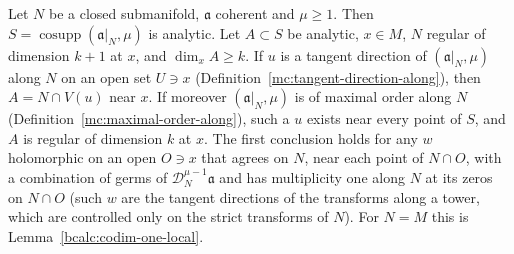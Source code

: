 \begin{lemma}
\label{bcalc:codim-one-local-along}
\leanok
Let \(N\) be a closed submanifold, \(\mathfrak a\) coherent and \(\mu\ge1\). Then \(S=\operatorname{cosupp}(\mathfrak a|_N,\mu)\) is analytic. Let \(A\subset S\) be
analytic, \(x\in M\), \(N\) regular of dimension \(k+1\) at \(x\), and \(\dim_xA\ge k\). If \(u\) is a tangent direction of \((\mathfrak a|_N,\mu)\) along \(N\) on an open
set \(U\ni x\) (Definition~\ref{mc:tangent-direction-along}), then \(A=N\cap V(u)\) near \(x\). If moreover \((\mathfrak a|_N,\mu)\) is of maximal order along \(N\)
(Definition~\ref{mc:maximal-order-along}), such a \(u\) exists near every point of \(S\), and \(A\) is regular of dimension \(k\) at \(x\). The first conclusion holds for
any \(w\) holomorphic on an open \(O\ni x\) that agrees on \(N\), near each point of \(N\cap O\), with a combination of germs of \(\mathcal D_N^{\mu-1}\mathfrak a\) and has
multiplicity one along \(N\) at its zeros on \(N\cap O\) (such \(w\) are the tangent directions of the transforms along a tower, which are controlled only on
the strict transforms of \(N\)). For \(N=M\) this is Lemma~\ref{bcalc:codim-one-local}.
\end{lemma}
